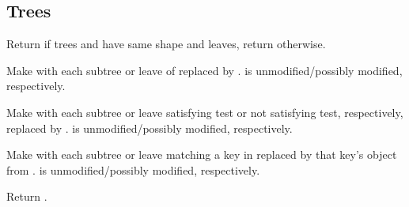 \subsection{Trees} 
\begin{LIST}{1cm}

  {
  Return \retval{\T} if trees  and  have same
  shape and  leaves, return \retval{\NIL} otherwise.
  }

  {
  Make  with each subtree or leave of  replaced by
  .  is unmodified/possibly modified, respectively.
  }

  {
  Make  with each subtree or leave
  satisfying test or not satisfying test, respectively, replaced by
  .  is unmodified/possibly modified, respectively.
  }

  {
  Make  with each subtree or leave matching
  a key in  replaced by that key's object from . 
   is unmodified/possibly modified, respectively.
  }

  {
  Return .
  }

\end{LIST}


